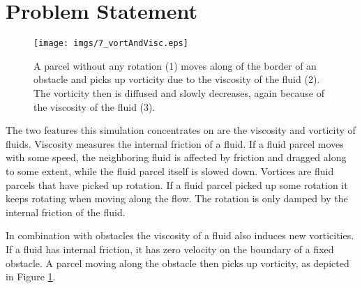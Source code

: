 
\section{Problem Statement}



\begin{figure}%
\begin{center}
\texttt{[image: imgs/7\_vortAndVisc.eps]}%
\end{center}
\caption{A parcel without any rotation (1) moves along of the border of an obstacle and picks up vorticity due to the viscosity of the fluid (2). The vorticity then is diffused and slowly decreases, again because of the viscosity of the fluid (3).}%
\label{fig:fd_vortAndVisc}%
\end{figure}

The two features this simulation concentrates on are the viscosity and vorticity of fluids. Viscosity measures the internal friction of a fluid. If a fluid parcel moves with some speed, the neighboring fluid is affected by friction and dragged along to some extent, while the fluid parcel itself is slowed down. 
Vortices are fluid parcels that have picked up rotation. If a fluid parcel picked up some rotation it keeps rotating when moving along the flow. The rotation is only damped by the internal friction of the fluid. 

In combination with obstacles the viscosity of a fluid also induces new vorticities. If a fluid has internal friction, it has zero velocity on the boundary of a fixed obstacle. A parcel moving  along the obstacle then picks up vorticity, as depicted in Figure \ref{fig:fd_vortAndVisc}.

